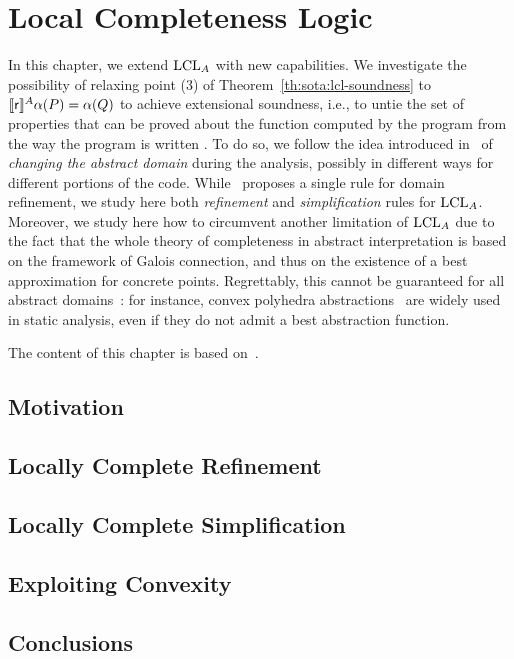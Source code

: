 
\chapter{Local Completeness Logic}\label{ch:lcla}
In this chapter, we extend $\text{LCL}_A$ with new capabilities. We investigate the possibility of relaxing point (3) of Theorem~\ref{th:sota:lcl-soundness} to $\llbracket\mathsf{r}\rrbracket^{A} \alpha(P) = \alpha(Q)$ to achieve extensional soundness, i.e., to untie the set of properties that can be proved about the function computed by the program from the way the program is written . To do so, we follow the idea introduced in~\cite{BGGR23} of \emph{changing the abstract domain} during the analysis, possibly in different ways for different portions of the code.
While~\cite{BGGR23} proposes a single rule for domain refinement, we study here both \emph{refinement} and \emph{simplification} rules for $\text{LCL}_A$.
Moreover, we study here how to circumvent another limitation of $\text{LCL}_A$ due to the fact that the whole theory of completeness in abstract interpretation is based on the framework of Galois connection, and thus on the existence of a best approximation for concrete points. Regrettably, this cannot be guaranteed for all abstract domains~\cite[§15]{CC92}: for instance, convex polyhedra abstractions~\cite{CH78} are widely used in static analysis, even if they do not admit a best abstraction function.

The content of this chapter is based on~\cite{ABG23}.

\section{Motivation}

\section{Locally Complete Refinement}

\section{Locally Complete Simplification}

\section{Exploiting Convexity}

\section{Conclusions}
